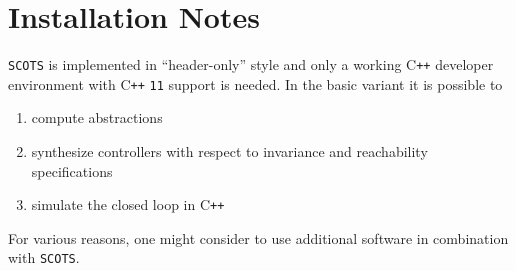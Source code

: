 \documentclass[a4paper]{amsart}
\newcommand\Cpp{C\texttt{++} }
\begin{document}
\newpage
\section{Installation Notes}
\label{s:req}

{\tt SCOTS} is implemented in ``header-only'' style and  only a working \Cpp developer environment with \Cpp{\tt11} support
is needed. In the basic variant it is possible to
\begin{enumerate}
  \item compute abstractions
  \item synthesize controllers with respect to invariance and reachability specifications 
  \item simulate the closed loop in \Cpp
\end{enumerate}
For various reasons, one might consider to use additional software in combination with {\tt SCOTS}.
\end{document}
